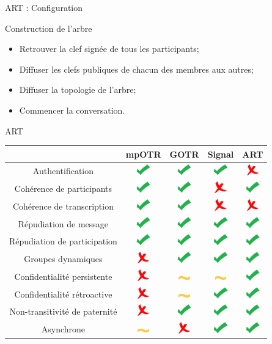 \documentclass{beamer}
\newcommand{\okay}{\includegraphics[height=0.5cm]{img/check.png}}
\newcommand{\nope}{\includegraphics[height=0.5cm]{img/cross.png}}
\newcommand{\sortof}{\includegraphics[width=0.5cm]{img/tilde.png}}
\begin{document}
\begin{frame}{ART : Configuration}
	\begin{block}{Construction de l'arbre}
  	\begin{itemize}
  		\item Retrouver la clef signée de tous les participants;
			\item Diffuser les clefs publiques de chacun des membres aux autres;
			\item Diffuser la topologie de l'arbre;
			\item Commencer la conversation.
  	\end{itemize}
	\end{block}
\end{frame}

\begin{frame}{ART}
	\center
  	\begin{tabular}{c|cccc}
			                              & mpOTR   & GOTR    & Signal  & ART   \\
			\hline
  		Authentification              & \okay   & \okay   & \okay   & \nope \\
  		\hline
  		Cohérence de participants     & \okay   & \okay   & \nope   & \okay \\
  		Cohérence de transcription    & \okay   & \okay   & \nope   & \nope \\
  		\hline
  		Répudiation de message        & \okay   & \okay   & \okay   & \okay \\
  		Répudiation de participation  & \okay   & \okay   & \okay   & \okay \\
  		\hline
  		Groupes dynamiques            & \nope   & \okay   & \okay   & \okay \\
  		\hline
  		Confidentialité persistente   & \nope   & \sortof & \sortof & \okay \\
  		Confidentialité rétroactive   & \nope   & \sortof & \okay   & \okay \\
  		Non-transitivité de paternité & \nope   & \okay   & \okay   & \okay \\
  		\hline
  		Asynchrone                    & \sortof & \nope   & \okay   & \okay
    \end{tabular}
\end{frame}
\end{document}

